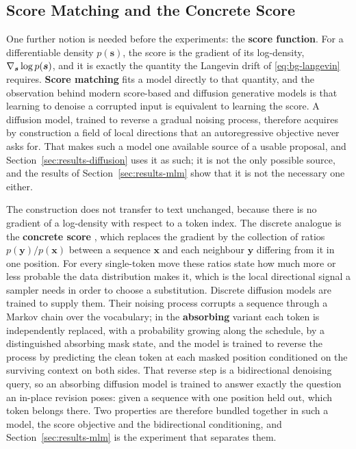 \subsection{Score Matching and the Concrete Score}
\label{sec:bg-score}
\label{sec:bg-discrete-diffusion}

One further notion is needed before the experiments: the \textbf{score function}. For a differentiable density $p(\bm{s})$, the score is the gradient of its log-density, $\nabla_{\bm{s}} \log p(\bm{s})$, and it is exactly the quantity the Langevin drift of \eqref{eq:bg-langevin} requires. \textbf{Score matching} \citep{vincent2011connection} fits a model directly to that quantity, and the observation behind modern score-based and diffusion generative models \citep{song2019generative, ho2020denoising} is that learning to denoise a corrupted input is equivalent to learning the score. A diffusion model, trained to reverse a gradual noising process, therefore acquires by construction a field of local directions that an autoregressive objective never asks for. That makes such a model one available source of a usable proposal, and Section~\ref{sec:results-diffusion} uses it as such; it is not the only possible source, and the results of Section~\ref{sec:results-mlm} show that it is not the necessary one either.

The construction does not transfer to text unchanged, because there is no gradient of a log-density with respect to a token index. The discrete analogue is the \textbf{concrete score} \citep{meng2022concrete}, which replaces the gradient by the collection of ratios $p(\bm{y})/p(\bm{x})$ between a sequence $\bm{x}$ and each neighbour $\bm{y}$ differing from it in one position. For every single-token move these ratios state how much more or less probable the data distribution makes it, which is the local directional signal a sampler needs in order to choose a substitution. Discrete diffusion models are trained to supply them. Their noising process corrupts a sequence through a Markov chain over the vocabulary; in the \textbf{absorbing} variant \citep{austin2021structured} each token is independently replaced, with a probability growing along the schedule, by a distinguished absorbing mask state, and the model is trained to reverse the process by predicting the clean token at each masked position conditioned on the surviving context on both sides. That reverse step is a bidirectional denoising query, so an absorbing diffusion model is trained to answer exactly the question an in-place revision poses: given a sequence with one position held out, which token belongs there. Two properties are therefore bundled together in such a model, the score objective and the bidirectional conditioning, and Section~\ref{sec:results-mlm} is the experiment that separates them.

